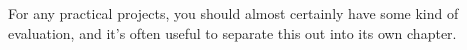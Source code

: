 For any practical projects, you should almost certainly have
some kind of evaluation, and it's often useful to separate 
this out into its own chapter. 